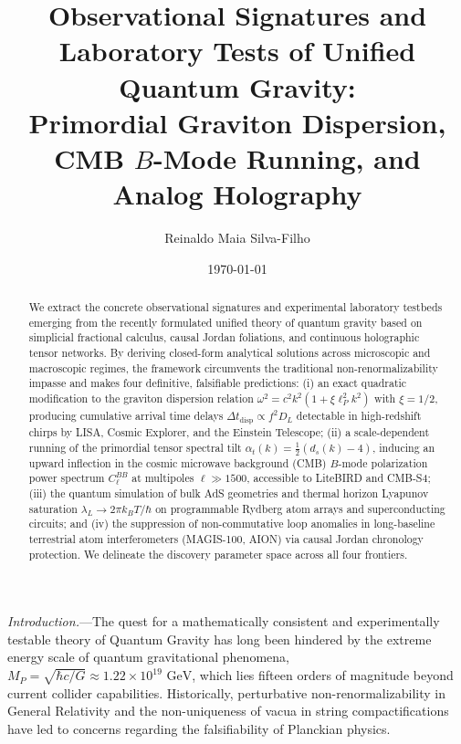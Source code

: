 \documentclass[aps,prl,reprint,twocolumn,superscriptaddress,nofootinbib,floatfix]{revtex4-2}
\begin{document}
\title{Observational Signatures and Laboratory Tests of Unified Quantum Gravity:\texorpdfstring{\\}{ }Primordial Graviton Dispersion, CMB \texorpdfstring{$B$}{B}-Mode Running, and Analog Holography}

\author{Reinaldo Maia Silva-Filho}

\date{\today}

\begin{abstract}
We extract the concrete observational signatures and experimental laboratory testbeds emerging from the recently formulated unified theory of quantum gravity based on simplicial fractional calculus, causal Jordan foliations, and continuous holographic tensor networks. By deriving closed-form analytical solutions across microscopic and macroscopic regimes, the framework circumvents the traditional non-renormalizability impasse and makes four definitive, falsifiable predictions: (i) an exact quadratic modification to the graviton dispersion relation $\omega^2 = c^2 k^2 (1 + \xi \ell_P^2 k^2)$ with $\xi = 1/2$, producing cumulative arrival time delays $\Delta t_{\mathrm{disp}} \propto f^2 D_L$ detectable in high-redshift chirps by LISA, Cosmic Explorer, and the Einstein Telescope; (ii) a scale-dependent running of the primordial tensor spectral tilt $\alpha_t(k) = \frac{1}{2}(d_s(k) - 4)$, inducing an upward inflection in the cosmic microwave background (CMB) $B$-mode polarization power spectrum $C_\ell^{BB}$ at multipoles $\ell \gg 1500$, accessible to LiteBIRD and CMB-S4; (iii) the quantum simulation of bulk AdS geometries and thermal horizon Lyapunov saturation $\lambda_L \to 2\pi k_B T / \hbar$ on programmable Rydberg atom arrays and superconducting circuits; and (iv) the suppression of non-commutative loop anomalies in long-baseline terrestrial atom interferometers (MAGIS-100, AION) via causal Jordan chronology protection. We delineate the discovery parameter space across all four frontiers.
\end{abstract}

\maketitle

\emph{Introduction.}---The quest for a mathematically consistent and experimentally testable theory of Quantum Gravity has long been hindered by the extreme energy scale of quantum gravitational phenomena, $M_P = \sqrt{\hbar c / G} \approx 1.22 \times 10^{19}\text{ GeV}$, which lies fifteen orders of magnitude beyond current collider capabilities. Historically, perturbative non-renormalizability in General Relativity \cite{goroff1986ultraviolet} and the non-uniqueness of vacua in string compactifications have led to concerns regarding the falsifiability of Planckian physics.
\end{document}
